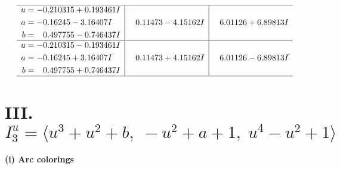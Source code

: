 \documentclass[1p]{elsarticle_modified}
\theoremstyle{definition}
\begin{document}
$$\begin{array}{c|c|c}
 \hline 
\begin{aligned}
u &= -0.210315 + 0.193461 I \\
a &= -0.16245 - 3.16407 I \\
b &= \phantom{-}0.497755 - 0.746437 I\end{aligned}
 & \phantom{-}0.11473 - 4.15162 I & \phantom{-}6.01126 + 6.89813 I \\ \hline\begin{aligned}
u &= -0.210315 - 0.193461 I \\
a &= -0.16245 + 3.16407 I \\
b &= \phantom{-}0.497755 + 0.746437 I\end{aligned}
 & \phantom{-}0.11473 + 4.15162 I & \phantom{-}6.01126 - 6.89813 I\\
 \hline 
 \end{array}$$\newpage\newpage\renewcommand{\arraystretch}{1}
\centering \section*{III. $I^u_{3}= \langle u^3+u^2+b,\;- u^2+a+1,\;u^4- u^2+1 \rangle$}
\flushleft \textbf{(i) Arc colorings}\\
\end{document}
